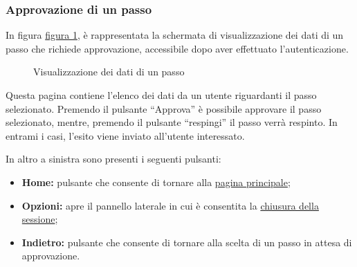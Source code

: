 \subsubsection{Approvazione di un passo}

In figura \hyperref[fig:Fapprove]{figura \ref{fig:Fapprove}}, è rappresentata la schermata di visualizzazione dei dati di un passo che richiede approvazione, accessibile dopo aver effettuato l'autenticazione.

\begin{figure}[H] \centering 
{} \caption{Visualizzazione dei dati di un passo}
\label{fig:Fapprove}
\end{figure}

Questa pagina contiene l'elenco dei dati da un utente riguardanti il passo selezionato. 
Premendo il pulsante ``Approva'' è possibile approvare il passo selezionato, mentre, premendo il pulsante ``respingi'' il passo verrà respinto. In entrami i casi, l'esito viene inviato all'utente interessato.

In altro a sinistra sono presenti i seguenti pulsanti:
\begin{itemize}
\item \textbf{Home:} pulsante che consente di tornare alla \hyperref[home]{pagina principale};
\item \textbf{Opzioni:} apre il pannello laterale in cui è consentita la \hyperref[logout]{chiusura della sessione};
\item \textbf{Indietro:} pulsante che consente di tornare alla scelta di un passo in attesa di approvazione.
\end{itemize}

